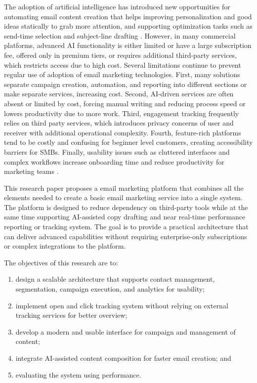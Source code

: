 \documentclass[12pt,journal,compsoc]{IEEEtran}
\begin{document}
The adoption of artificial intelligence has introduced new opportunities for automating email content creation that helps improving personalization and good ideas statically to grab more attention, and supporting optimization tasks such as send-time selection and subject-line drafting \cite{ref4}. However, in many commercial platforms, advanced AI functionality is either limited or have a large subscription fee, offered only in premium tiers, or requires additional third-party services, which restricts access due to high cost. Several limitations continue to prevent regular use of adoption of email marketing technologies. First, many solutions separate campaign creation, automation, and reporting into different sections or make separate services, increasing cost. Second, AI-driven services are often absent or limited by cost, forcing manual writing and reducing process speed or lowers productivity due to more work. Third, engagement tracking frequently relies on third party services, which introduces privacy concerns of user and receiver with additional operational complexity. Fourth, feature-rich platforms tend to be costly and confusing for beginner level customers, creating accessibility barriers for SMBs. Finally, usability issues such as cluttered interfaces and complex workflows increase onboarding time and reduce productivity for marketing teams \cite{ref5}.

This research paper proposes a email marketing platform that combines all the elements needed to create a basic email marketing service into a single system. The platform is designed to reduce dependency on third-party tools while at the same time supporting AI-assisted copy drafting and near real-time performance reporting or tracking system. The goal is to provide a practical architecture that can deliver advanced capabilities without requiring enterprise-only subscriptions or complex integrations to the platform.

The objectives of this research are to:
\begin{enumerate}
	\item design a scalable architecture that supports contact management, segmentation, campaign execution, and analytics for usability;
	\item implement open and click tracking system without relying on external tracking services for better overview;
	\item develop a modern and usable interface for campaign and management of content;
	\item integrate AI-assisted content composition for faster email creation; and
	\item evaluating the system using performance.
\end{enumerate}
\end{document}
